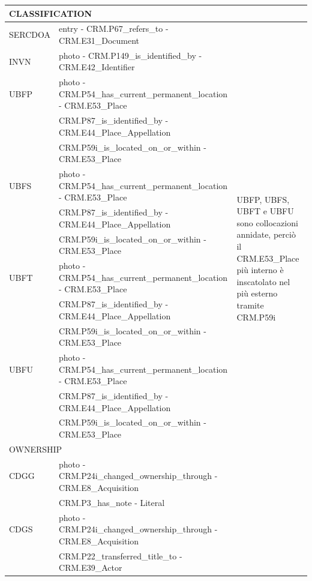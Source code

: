 \begin{center}
\begin{longtable}{ | p{1cm} | p{8cm} | p{3cm} | }
  \multicolumn{3}{|l|}{\cellcolor{lightcyan}CLASSIFICATION}\\ \hline
  SERCDOA &  entry - CRM.P67\_refers\_to - CRM.E31\_Document & \\ \hline
  INVN &  photo - CRM.P149\_is\_identified\_by - CRM.E42\_Identifier & \\ \hline
  \pagebreak
  UBFP &  photo - CRM.P54\_has\_current\_permanent\_location - CRM.E53\_Place & \multirow{12}{3cm}{UBFP, UBFS, UBFT e UBFU sono collocazioni annidate, perciò il CRM.E53\_Place più interno è inscatolato nel più esterno tramite CRM.P59i} \\
   & CRM.P87\_is\_identified\_by - CRM.E44\_Place\_Appellation & \\
   & CRM.P59i\_is\_located\_on\_or\_within - CRM.E53\_Place & \\ \cline{1-2}
  UBFS &  photo - CRM.P54\_has\_current\_permanent\_location - CRM.E53\_Place & \\
   & CRM.P87\_is\_identified\_by - CRM.E44\_Place\_Appellation & \\
   & CRM.P59i\_is\_located\_on\_or\_within - CRM.E53\_Place & \\ \cline{1-2}
  UBFT &  photo - CRM.P54\_has\_current\_permanent\_location - CRM.E53\_Place & \\
   & CRM.P87\_is\_identified\_by - CRM.E44\_Place\_Appellation & \\
   & CRM.P59i\_is\_located\_on\_or\_within - CRM.E53\_Place & \\ \cline{1-2}
  UBFU &  photo - CRM.P54\_has\_current\_permanent\_location - CRM.E53\_Place & \\
   & CRM.P87\_is\_identified\_by - CRM.E44\_Place\_Appellation & \\
   & CRM.P59i\_is\_located\_on\_or\_within - CRM.E53\_Place & \\ \hline
  
  \multicolumn{3}{|l|}{\cellcolor{lightcyan}OWNERSHIP}\\ \hline
  CDGG &  photo - CRM.P24i\_changed\_ownership\_through - CRM.E8\_Acquisition & \\
   & CRM.P3\_has\_note - Literal & \\ \hline
  CDGS &  photo - CRM.P24i\_changed\_ownership\_through - CRM.E8\_Acquisition & \\
   & CRM.P22\_transferred\_title\_to - CRM.E39\_Actor & \\ \hline
  

\end{longtable}
\end{center}
